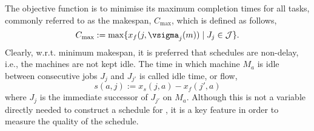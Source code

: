 The objective function is to minimise its maximum completion times for all tasks, commonly referred to as the makespan, $C_{\max}$, which is defined as follows,
\begin{equation}
  C_{\max} := \max\{x_f(j,\vsigma_j(m))\;|\;J_j\in\mathcal{J}\}.\label{eq:makespan}
\end{equation} 
Clearly, w.r.t. minimum makespan, it is preferred that schedules are non-delay, i.e., the machines are not kept idle. The time in which machine $M_a$ is idle between consecutive jobs $J_j$ and $J_{j'}$ is called idle time, or flow, 
\begin{equation} s(a,j):=x_s(j,a)-x_f(j',a) \label{eq:slack}\end{equation}
where $J_j$ is the immediate successor of $J_{j'}$ on $M_a$. Although this is not a variable directly needed to construct a schedule for \JSP, it is a key feature in order to measure the quality of the schedule. 

